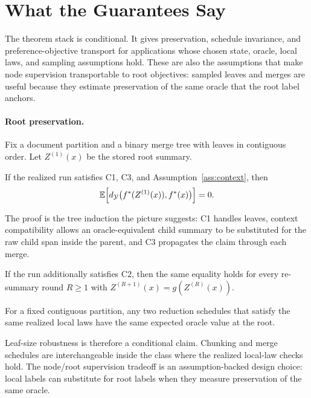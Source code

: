 \section{What the Guarantees Say}\label{sec:min-guarantees}

The theorem stack is conditional. It gives preservation, schedule invariance,
and preference-objective transport for applications whose chosen state,
oracle, local laws, and sampling assumptions hold. These are also the
assumptions that make node supervision transportable to root objectives:
sampled leaves and merges are useful because they estimate preservation of
the same oracle that the root label anchors.

\paragraph{Root preservation.}
Fix a document partition and a binary merge tree with leaves in contiguous
order. Let $Z^{(1)}(x)$ be the stored root summary.

\begin{theorem}\label{thm:one-pass}
If the realized run satisfies C1, C3, and
Assumption~\ref{ass:context}, then
\[
  \mathbb{E}\!\left[
    d_{\mathcal{Y}}\big(f^\ast(Z^{(1)}(x)),f^\ast(x)\big)
  \right]=0.
\]
\end{theorem}

The proof is the tree induction the picture suggests: C1 handles leaves,
context compatibility allows an oracle-equivalent child summary to be
substituted for the raw child span inside the parent, and C3 propagates the
claim through each merge.

\begin{theorem}\label{thm:multi-round}
If the run additionally satisfies C2, then the same equality holds for every
re-summary round $R\ge 1$ with $Z^{(R+1)}(x)=g(Z^{(R)}(x))$.
\end{theorem}

\begin{corollary}\label{cor:schedule}
For a fixed contiguous partition, any two reduction schedules that satisfy
the same realized local laws have the same expected oracle value at the root.
\end{corollary}

Leaf-size robustness is therefore a conditional claim. Chunking and merge
schedules are interchangeable inside the class where the realized local-law
checks hold. The node/root supervision tradeoff is an assumption-backed design
choice: local labels can substitute for root labels when they measure
preservation of the same oracle.

